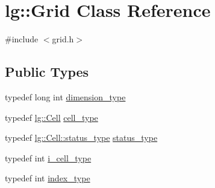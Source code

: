 \hypertarget{classlg_1_1Grid}{}\section{lg\+:\+:Grid Class Reference}
\label{classlg_1_1Grid}


{\ttfamily \#include $<$grid.\+h$>$}

\subsection*{Public Types}
\begin{DoxyCompactItemize}
\item 
typedef long int \hyperlink{classlg_1_1Grid_a11f5474e622f3053e006acf549c41f10}{dimension\+\_\+type}
\item 
typedef \hyperlink{classlg_1_1Cell}{lg\+::\+Cell} \hyperlink{classlg_1_1Grid_a87cd073ad5dc312152c4c94b5343c709}{cell\+\_\+type}
\item 
typedef \hyperlink{classlg_1_1Cell_a10376a213d664b96708f0d1e6d512f20}{lg\+::\+Cell\+::status\+\_\+type} \hyperlink{classlg_1_1Grid_a9938cc664c28a2250b8bfed63f8cb03a}{status\+\_\+type}
\item 
typedef int \hyperlink{classlg_1_1Grid_abbbca10278d66749921671ab6ec11fcb}{i\+\_\+cell\+\_\+type}
\item 
typedef int \hyperlink{classlg_1_1Grid_a3273db5925a31839b6450849af301e45}{index\+\_\+type}
\end{DoxyCompactItemize}

